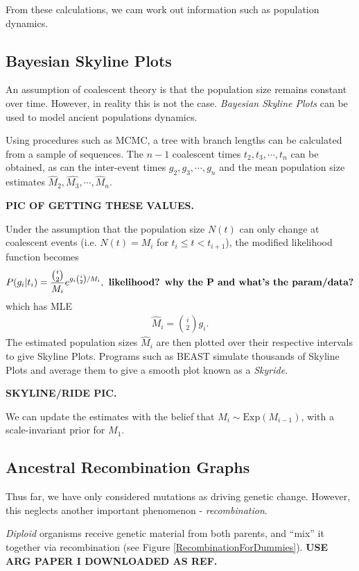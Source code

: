 \documentclass[12pt]{article}
\begin{document}
From these calculations, we cam work out information such as population dynamics.
 
\subsection{Bayesian Skyline Plots}\label{ssec:skyline}
An assumption of coalescent theory is that the population size remains constant over time. However, in reality this is not the case. \emph{Bayesian Skyline Plots} can be used to model ancient populations dynamics.

Using procedures such as MCMC, a tree with branch lengths can be calculated from a sample of sequences. The $n-1$ coalescent times $t_2, t_3, \cdots, t_n$ can be obtained, as can the inter-event times $g_2, g_3, \cdots, g_n$ and the mean population size estimates $\widehat{M}_2, \widehat{M_3}, \cdots, \widehat{M}_n$.

\textbf{PIC OF GETTING THESE VALUES.}

Under the assumption that the population size $N(t)$ can only change at coalescent events (i.e. $N(t)=M_i$ for $t_i\le t<t_{i+1}$), the modified likelihood function becomes
\begin{eqnarray}
  P(g_i|t_i)=\frac{{i\choose 2}}{M_i}e^{g_i{i\choose 2}/M_i}, \text{\textbf{ likelihood? why the P and what's the param/data?}}
\end{eqnarray}
which has MLE
\begin{eqnarray}
  \widehat{M}_i={i\choose 2}g_i.
\end{eqnarray}
The estimated population sizes $ \widehat{M}_i$ are then plotted over their respective intervals to give Skyline Plots. Programs such as BEAST simulate thousands of Skyline Plots and average them to give a smooth plot known as a \emph{Skyride}.

\textbf{SKYLINE/RIDE PIC.}

We can update the estimates with the belief that $M_i\sim\text{Exp}(M_{i-1})$, with a scale-invariant prior for $M_1$.

\subsection{Ancestral Recombination Graphs}\label{ssec:ARGs}
Thus far, we have only considered mutations as driving genetic change. However, this neglects another important phenomenon - \emph{recombination}.

\emph{Diploid} organisms receive genetic material from both parents, and ``mix'' it together via recombination (see Figure \ref{RecombinationForDummies}). \textbf{USE ARG PAPER I DOWNLOADED AS REF.}
\end{document}
